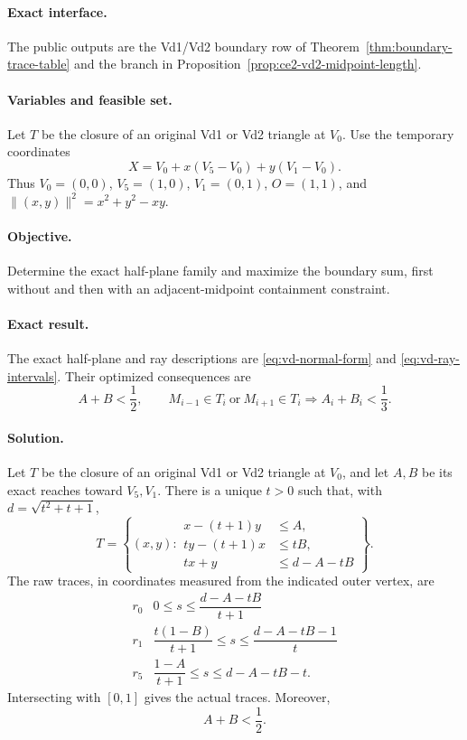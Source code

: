 \paragraph{Exact interface.}
The public outputs are the Vd1/Vd2 boundary row of
Theorem~\ref{thm:boundary-trace-table} and the branch in
Proposition~\ref{prop:ce2-vd2-midpoint-length}.

\paragraph{Variables and feasible set.}
Let $T$ be the closure of an original Vd1 or Vd2 triangle at $V_0$.
Use the temporary coordinates
\[
 X=V_0+x(V_5-V_0)+y(V_1-V_0).
\]
Thus $V_0=(0,0)$, $V_5=(1,0)$, $V_1=(0,1)$, $O=(1,1)$, and
$\lVert(x,y)\rVert^2=x^2+y^2-xy$.

\paragraph{Objective.}
Determine the exact half-plane family and maximize the boundary sum, first
without and then with an adjacent-midpoint containment constraint.

\paragraph{Exact result.}
The exact half-plane and ray descriptions are
\eqref{eq:vd-normal-form} and \eqref{eq:vd-ray-intervals}.  Their optimized
consequences are
\[
 A+B<\frac12,
 \qquad
 M_{i-1}\in T_i\ \text{or}\ M_{i+1}\in T_i
 \Longrightarrow A_i+B_i<\frac13.
\]

\paragraph{Solution.}

\begin{proposition}
\label{prop:vd-corner-normal-form}
Let $T$ be the closure of an original Vd1 or Vd2 triangle at $V_0$, and let
$A,B$ be its exact reaches toward $V_5,V_1$.  There is a unique $t>0$ such
that, with $d=\sqrt{t^2+t+1}$,
\[
 T=\left\{(x,y):
 \begin{aligned}
 x-(t+1)y&\le A,\\
 ty-(t+1)x&\le tB,\\
 tx+y&\le d-A-tB
 \end{aligned}\right\}.
 \label{eq:vd-normal-form}
\]
The raw traces, in coordinates measured from the indicated outer vertex, are
\[
 \begin{array}{c|c}
 r_0&0\le s\le\dfrac{d-A-tB}{t+1}\\[6pt]
 r_1&\dfrac{t(1-B)}{t+1}\le s\le\dfrac{d-A-tB-1}{t}\\[8pt]
 r_5&\dfrac{1-A}{t+1}\le s\le d-A-tB-t.
 \end{array}
 \label{eq:vd-ray-intervals}
\]
Intersecting with $[0,1]$ gives the actual traces.  Moreover,
\begin{equation}
 A+B<\frac12.
 \label{eq:vd-half-cap}
\end{equation}
\end{proposition}

